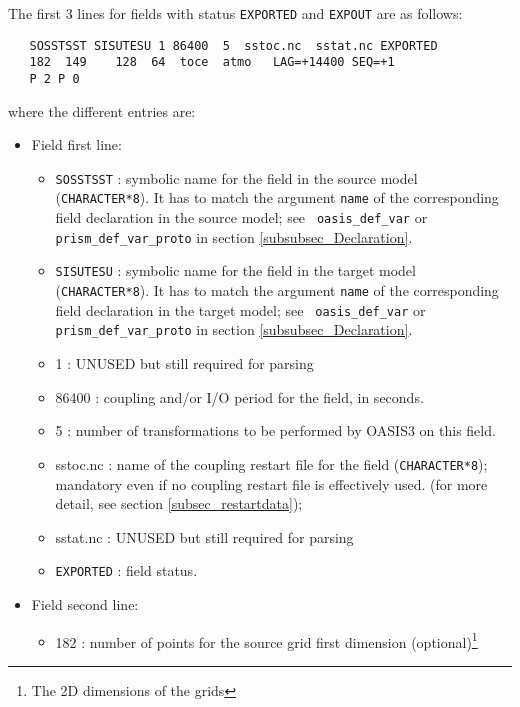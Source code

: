   The first 3 lines for fields with status {\tt EXPORTED} and 
  {\tt EXPOUT} are as follows:
  \begin{verbatim}
   SOSSTSST SISUTESU 1 86400  5  sstoc.nc  sstat.nc EXPORTED
   182  149    128  64  toce  atmo   LAG=+14400 SEQ=+1
   P 2 P 0 
  \end{verbatim}
  where the different entries are:
    \begin{itemize}
      \item Field first line:
        \begin{itemize}
        \item {\tt SOSSTSST} : symbolic name for the field in the
              source model ({\tt CHARACTER*8}). It has to match the
              argument {\tt name} of the corresponding field
              declaration in the source model; see {\tt
                oasis\_def\_var} or {\tt
              prism\_def\_var\_proto} in section
              \ref{subsubsec_Declaration}.
        \item {\tt SISUTESU} : symbolic name for the field in the
              target model ({\tt CHARACTER*8}).  It has to match the
              argument {\tt name} of the corresponding field
              declaration in the target model; see {\tt
                oasis\_def\_var} or {\tt
              prism\_def\_var\_proto} in section
              \ref{subsubsec_Declaration}.
        \item 1 : UNUSED but still required for parsing
        \item 86400 : coupling and/or I/O period for the field, in
        seconds. 
        \item 5 : number of transformations to be performed by OASIS3 on this field.  
        \item sstoc.nc : name of the coupling restart file for the
          field ({\tt CHARACTER*8}); 
          mandatory even if no coupling restart file is effectively
          used. (for more detail, see section \ref{subsec_restartdata});
        \item sstat.nc : UNUSED but still required for parsing
        \item {\tt EXPORTED} : field status.
        \end{itemize}
      \item Field second line:
        \begin{itemize}
        \item 182 : number of points for the source grid first
        dimension (optional)\footnote{The 2D dimensions of the grids
}
\end{itemize}
\end{itemize}

